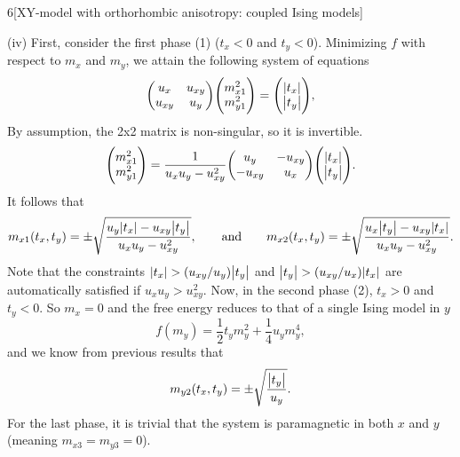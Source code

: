 \documentclass[12pt]{article}
\begin{document}
\begin{problem}{6}[XY-model with orthorhombic anisotropy: coupled Ising models]
\begin{solution}
(iv) First, consider the first phase (1) ($t_x<0$ and $t_y<0$). Minimizing $f$ 
with respect to $m_x$ and $m_y$, we attain the following system of equations
\begin{equation}\label{p6c:m}
    \mqty(u_x&u_{xy}\\u_{xy}&u_y)\mqty(m_{x1}^2\\m_{y1}^2)=\mqty(\abs{t_x}\\\abs{t_y}),
\end{equation}
By assumption, the 2x2 matrix is non-singular, so it is invertible.
\begin{equation}
    \mqty(m_{x1}^2\\m_{y1}^2)=\frac1{u_xu_y-u_{xy}^2}\mqty(u_y&-u_{xy}\\-u_{xy}&u_x)\mqty(\abs{t_x}\\\abs{t_y}). 
\end{equation}
It follows that
\begin{equation}
    m_{x1}(t_x,t_y)=\pm\sqrt{\frac{u_y\abs{t_x}-u_{xy}\abs{t_y}}{u_xu_y-u_{xy}^2}}
    ,\qquad\text{and}\qquad
    m_{x2}(t_x,t_y)=\pm\sqrt{\frac{u_x\abs{t_y}-u_{xy}\abs{t_x}}{u_xu_y-u_{xy}^2}}.
\end{equation}
Note that the constraints $\abs{t_x}>(u_{xy}/u_y)\abs{t_y}$ and
$\abs{t_y}>(u_{xy}/u_x)\abs{t_x}$ are automatically satisfied if
$u_xu_y>u_{xy}^2$. Now, in the second phase (2), $t_x>0$ and $t_y<0$. So 
$m_x=0$ and the free energy reduces to that of a single Ising model in $y$
\begin{equation}
    f(m_y)=\frac12t_ym_y^2+\frac14u_ym_y^4, 
\end{equation}
and we know from previous results that
\begin{equation}\label{p6c:m2}
    m_{y2}(t_x,t_y)=\pm\sqrt{\frac{\abs{t_y}}{u_y}}. 
\end{equation}
For the last phase, it is trivial that the system is paramagnetic in both $x$
and $y$ (meaning $m_{x3}=m_{y3}=0$).
\end{solution}


\end{problem}
\end{document}

